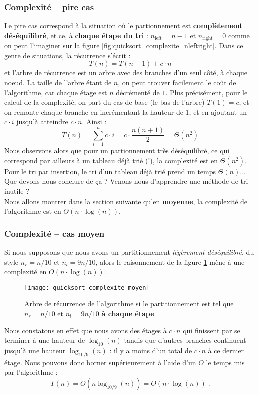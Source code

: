 \documentclass[12pt,a4paper]{book}
\newcommand{\pseudo}[1]{\rouge{\textsc{#1}}}
\begin{document}
\subsubsection{Complexité -- pire cas}
Le pire cas correspond à la situation où le partionnement est \textbf{complètement déséquilibré}, et ce, à \textbf{chaque étape du tri} : $n_{\text{left}} = n-1$ et $n_{\text{right}} = 0$ comme on peut l'imaginer sur la figure \ref{fig:quicksort_complexite_nleftright}. Dans ce genre de situations, la récurrence s'écrit :
$$T(n) = T(n-1) + c\cdot n$$
et l'arbre de récurrence est un arbre avec des branches d'un seul côté, à chaque noeud. La taille de l'arbre étant de $n$, on peut trouver facilement le coût de l'algorithme, car chaque étage est $n$ décrémenté de $1$. Plus précisément, pour le calcul de la complexité, on part du cas de base (le bas de l'arbre) $T(1)=c$, et on remonte chaque branche en incrémentant la hauteur de $1$, et en ajoutant un $c\cdot i$ jusqu'à atteindre $c\cdot n$. Ainsi :
$$T(n) = \sum_{i=1} ^n c\cdot i = c \cdot \dfrac{n(n+1)}{2} = \Theta(n^2)$$
Nous observons alors que pour un partionnement très déséquilibré, ce qui correspond par ailleurs à un tableau déjà trié (!), la complexité est en $\Theta(n^2)$. Pour le tri par insertion, le tri d'un tableau déjà trié prend un temps $\Theta(n)$... Que devons-nous conclure de ça ? Venons-nous d'apprendre une méthode de tri inutile ? \\

Nous allons montrer dans la section suivante qu'en \textbf{moyenne}, la complexité de l'algorithme \pseudo{Quicksort} est en $\Theta(n\cdot\log(n))$.
\subsubsection{Complexité -- cas moyen}
Si nous supposons que nous avons un partitionnement \textit{légèrement déséquilibré}, du style $n_r = n/10$ et $n_l = 9n/10$, alors le raisonnement de la figure \ref{fig:quicksort_complexite_moyen} mène à une complexité en $O(n\cdot \log(n))$.  
\begin{figure}[h]
\centering
\texttt{[image: quicksort\_complexite\_moyen]}
\caption{Arbre de récurrence de l'algorithme \pseudo{Quicksort} si le partitionnement est tel que $n_r = n/10$ et $n_l = 9n/10$ \textbf{à chaque étape}.}
\label{fig:quicksort_complexite_moyen}
\end{figure}
Nous constatons en effet que nous avons des étages à $c\cdot n$ qui finissent par se terminer à une hauteur de $\log_{10}(n)$ tandis que d'autres branches continuent jusqu'à une hauteur $\log_{10/9} (n)$ : il y a moins d'un total de $c\cdot n$ à ce dernier étage. Nous pouvons donc borner supérieurement à l'aide d'un $O$ le temps mis par l'algorithme :
$$T(n) = O(n\log_{10/9} (n)) = O(n\cdot \log(n)) \; .$$
\end{document}
